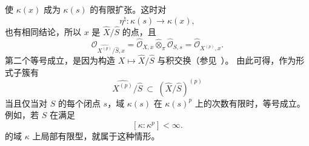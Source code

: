 使 \(\kappa(x)\) 成为 \(\kappa(s)\) 的有限扩张。这时对
\[
  \eta^\natural:\kappa(s)\longrightarrow\kappa(x),
\]
也有相同结论，所以 \(x\) 是 \(\widehat X/\widehat S\) 的点，且
\[
  \mathcal O_{\widehat{X^{(p)}}/\widehat S,x}
  =
  \widehat{\mathcal O}_{X,x}
  \widehat\otimes_{\pi}
  \widehat{\mathcal O}_{S,s}
  =
  \widehat{\mathcal O}_{X^{(p)},x}.
\]
第二个等号成立，是因为构造 \(X\mapsto\widehat X/\widehat S\) 与积交换\textup{（参见\ ）}。
由此可得，作为形式子簇有
\[
  \widehat{X^{(p)}}/\widehat S
  \ \subset\
  (\widehat X/\widehat S)^{(p)}
\]
当且仅当对 \(S\) 的每个闭点 \(s\)，域 \(\kappa(s)\) 在 \(\kappa(s)^p\) 上的次数有限时，等号成立。例如，若 \(S\) 在满足
\[
  [\kappa:\kappa^p]<\infty.
\]
的域 \(\kappa\) 上局部有限型，就属于这种情形。
